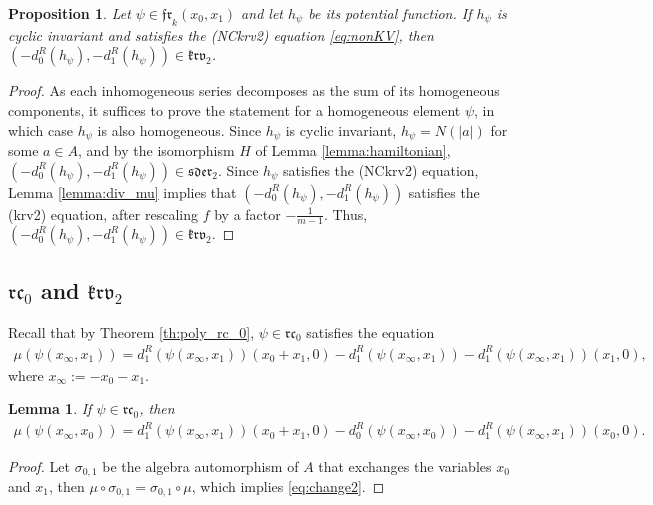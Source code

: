 \documentclass[a4paper,fleqn]{cas-sc}
\newtheorem{lemma}[theorem]{Lemma}
\newtheorem{proposition}[theorem]{Proposition}
\newcommand{\fr}{\mathfrak{fr}}
\begin{document}
\begin{proposition} \label{Prop:nkrv_krv}
Let $\psi \in \fr_k(x_0,x_1)$ and let $h_\psi$ be its potential function. %
If $h_\psi$ is cyclic invariant and satisfies the (NCkrv2) equation \eqref{eq:nonKV}, then $(-d^R_0(h_{\psi}),-d^R_1(h_{\psi}))\in \mathfrak{krv}_2$.
\end{proposition}

\begin{proof}
As each inhomogeneous series decomposes as the sum of its homogeneous components, it suffices to prove the statement for a homogeneous element $\psi$, in which case $h_{\psi}$ is also homogeneous. %
Since $h_{\psi}$ is cyclic invariant, $h_{\psi}=N(|a|)$ for some $a\in A$, and by the isomorphism $H$ of Lemma \ref{lemma:hamiltonian}, $(-d^R_0(h_{\psi}),-d^R_1(h_{\psi})) \in \mathfrak{sder}_2$. Since $h_\psi$ satisfies the (NCkrv2) equation, Lemma \ref{lemma:div_mu} implies that $(-d^R_0(h_{\psi}),-d^R_1(h_{\psi}))$ satisfies the (krv2) equation, after rescaling $f$ by a factor $-\frac{1}{m-1}$. Thus, $( -d^R_0(h_{\psi}),-d^R_1(h_{\psi})) \in \mathfrak{krv}_2$.
\end{proof}



\subsection{$\mathfrak{rc}_0$ and $\mathfrak{krv}_2$}
Recall that by Theorem \ref{th:poly_rc_0}, $\psi\in \mathfrak{rc}_0$ satisfies the equation 
\begin{align} \label{eq:change1}
	\mu(\psi(x_\infty,x_1))=d^R_1(\psi(x_\infty,x_1))(x_0+x_1,0)-d^R_1(\psi(x_\infty,x_1))-d^R_1(\psi(x_\infty,x_1))(x_1,0),
\end{align}
where $x_\infty:=-x_0-x_1$.
\begin{lemma}
If $\psi\in \mathfrak{rc}_0$, then
\begin{align}\label{eq:change2}
		\mu(\psi(x_\infty,x_0))=d^R_1(\psi(x_\infty,x_1))(x_0+x_1,0)-d^R_{0}(\psi(x_\infty,x_0))-d^R_1(\psi(x_\infty,x_1))(x_0,0).
	\end{align}
\end{lemma}

\begin{proof}
Let $\sigma_{0,1}$ be the algebra automorphism of $A$ that exchanges the variables $x_0$ and $x_1$, then
$\mu\circ\sigma_{0,1}=\sigma_{0,1}\circ \mu$, 
which implies \eqref{eq:change2}.
\end{proof}
\end{document}
